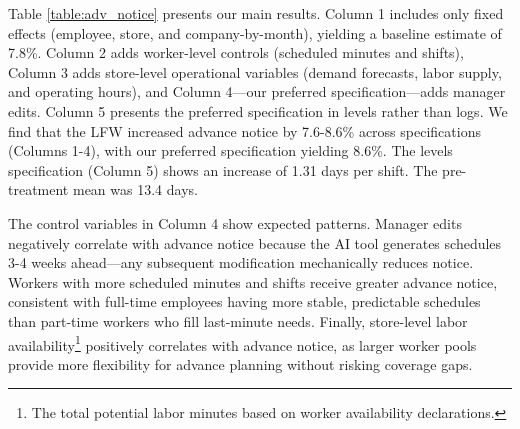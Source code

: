 \documentclass[letterpaper,11pt,leqno]{article}
\theoremstyle{paper}
\begin{document}
Table \ref{table:adv_notice} presents our main results. Column 1 includes only fixed effects (employee, store, and company-by-month), yielding a baseline estimate of 7.8\%. Column 2 adds worker-level controls (scheduled minutes and shifts), Column 3 adds store-level operational variables (demand forecasts, labor supply, and operating hours), and Column 4—our preferred specification—adds manager edits. Column 5 presents the preferred specification in levels rather than logs. We find that the LFW increased advance notice by 7.6-8.6\% across specifications (Columns 1-4), with our preferred specification yielding 8.6\%. The levels specification (Column 5) shows an increase of 1.31 days per shift. The pre-treatment mean was 13.4 days.

The control variables in Column 4 show expected patterns. Manager edits negatively correlate with advance notice because the AI tool generates schedules 3-4 weeks ahead—any subsequent modification mechanically reduces notice. Workers with more scheduled minutes and shifts receive greater advance notice, consistent with full-time employees having more stable, predictable schedules than part-time workers who fill last-minute needs. Finally, store-level labor availability\footnote{The total potential labor minutes based on worker availability declarations.} positively correlates with advance notice, as larger worker pools provide more flexibility for advance planning without risking coverage gaps.
\end{document}
